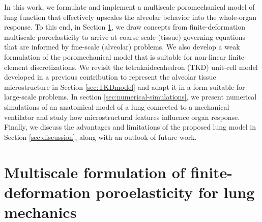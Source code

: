 \documentclass[preprint,3p,12pt,number,sort&compress]{elsarticle}
\begin{document}
In this work, we formulate and implement a multiscale poromechanical model of lung function that effectively upscales the alveolar behavior into the whole-organ response. To this end, in Section \ref{sec:multiscaleformulation}, we draw concepts from finite-deformation multiscale poroelasticity to arrive at coarse-scale (tissue) governing equations that are informed by fine-scale (alveolar) problems. We also develop a weak formulation of the poromechanical model that is suitable for non-linear finite-element discretizations. We revisit the tetrakaidecahedron (TKD) unit-cell model developed in a previous contribution to represent the alveolar tissue microstructure \cite{concha2020upscaling} in Section \ref{sec:TKDmodel} and adapt it in a form suitable for large-scale problems. In section \ref{sec:numerical-simulations}, we present numerical simulations of an anatomical model of a lung connected to a mechanical ventilator and study how microstructural features influence organ response. Finally, we discuss the advantages and limitations of the proposed lung model in Section \ref{sec:discussion}, along with an outlook of future work.


\section{Multiscale formulation of finite-deformation poroelasticity for lung mechanics}\label{sec:multiscaleformulation}
\end{document}
